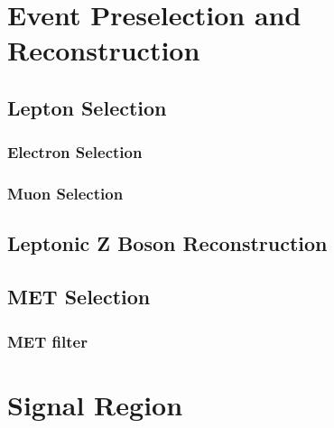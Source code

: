 \section{Event Preselection and Reconstruction}
\subsection{Lepton Selection}
\subsubsection{Electron Selection}
\subsubsection{Muon Selection}\label{sec:muonselection}
\subsection{Leptonic Z Boson Reconstruction}
\subsection{MET Selection}
\subsubsection{MET filter}

\section{Signal Region}
